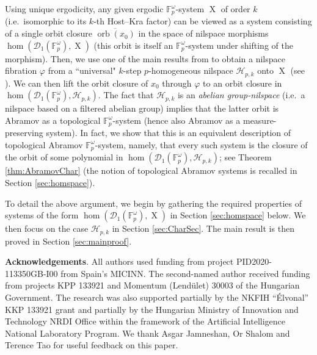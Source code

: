 \documentclass[a4paper,12pt,reqno]{amsart}
\theoremstyle{definition}
\newcommand{\mc}{\mathcal}
\newcommand{\mb}{\mathbb}
\DeclareMathOperator{\ns}{X}
\DeclareMathOperator{\orb}{orb}
\begin{document}
Using unique ergodicity, any given ergodic $\mb{F}_p^\omega$-system $\ns$ of order $k$ (i.e.\ isomorphic to its $k$-th Host--Kra factor) can be viewed as a system consisting of a single orbit closure $\overline{\orb(x_0)}$ in the space of nilspace morphisms $\hom(\mc{D}_1(\mb{F}_p^\omega),\ns)$ (this orbit is itself an $\mb{F}_p^\omega$-system under shifting of the morphism). Then, we use one of the main  results from \cite{CGSS-aff-ex} to obtain a nilspace fibration $\varphi$ from a ``universal" $k$-step $p$-homogeneous nilspace $\mc{H}_{p,k}$ onto $\ns$ (see \cite[Theorem 4.3]{CGSS-aff-ex}). We can then lift the orbit closure of $x_0$ through $\varphi$ to an orbit closure in $\hom(\mc{D}_1(\mb{F}_p^\omega),\mc{H}_{p,k})$. The fact that $\mc{H}_{p,k}$ is an \emph{abelian group-nilspace} (i.e.\ a nilspace based on a filtered abelian group) implies that the latter orbit is Abramov as a topological $\mb{F}_p^\omega$-system (hence also Abramov as a measure-preserving system). In fact, we show that this is an equivalent description of topological Abramov $\mb{F}_p^\omega$-system, namely, that every such system is the closure of the orbit of some polynomial in $\hom(\mc{D}_1(\mb{F}_p^\omega),\mc{H}_{p,k})$; see Theorem \ref{thm:AbramovChar} (the notion of topological Abramov systems is recalled in Section \ref{sec:homspace}).

To detail the above argument, we begin by gathering the required properties of systems of the form $\hom(\mc{D}_1(\mb{F}_p^\omega),\ns)$ in Section \ref{sec:homspace} below. We then focus on the case $\mc{H}_{p,k}$ in Section \ref{sec:CharSec}. The main result is then proved in Section \ref{sec:mainproof}.

\vspace*{0.5cm}

\noindent \textbf{Acknowledgements}. All authors used funding from project PID2020-113350GB-I00 from Spain’s MICINN.
The second-named author received funding from projects KPP 133921 and Momentum
(Lend\"ulet) 30003 of the Hungarian Government. The research was also supported partially
by the NKFIH ``\'Elvonal” KKP 133921 grant and partially by the Hungarian Ministry of
Innovation and Technology NRDI Office within the framework of the Artificial Intelligence
National Laboratory Program. We thank Asgar Jamneshan, Or Shalom and Terence Tao for useful feedback on this paper.
\end{document}
